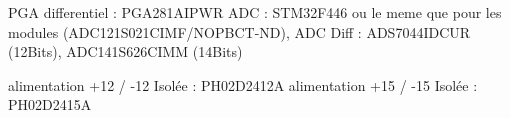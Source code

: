 PGA differentiel : PGA281AIPWR
ADC : STM32F446 ou le meme que pour les modules (ADC121S021CIMF/NOPBCT-ND), 
ADC Diff : ADS7044IDCUR (12Bits), ADC141S626CIMM (14Bits)

alimentation +12 / -12 Isolée : PH02D2412A
alimentation +15 / -15 Isolée : PH02D2415A

